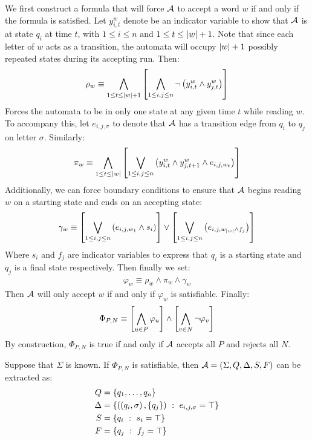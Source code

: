 We first construct a formula that will force \(\mathcal{A}\) to accept
a word \(w\) if and only if the formula is satisfied.
Let \(y_{i, t}^w\) denote be an indicator variable
to show that \(\mathcal{A}\) is at state \(q_i\) at time \(t\),
with \(1 \leq i \leq n\) and \(1 \leq t \leq \left\lvert w\right\rvert + 1\).
Note that since each letter of \(w\) acts as a transition,
the automata will occupy \(\left\lvert w\right\rvert + 1\) possibly repeated
states during its accepting run.
Then:
\begin{align*}
  \rho_w \equiv
    \bigwedge_{1 \leq t \leq \left\lvert w\right\rvert + 1}
      \left[\bigwedge_{1 \leq i, j \leq n}
        \neg \left(y_{i, t} ^w \land y_{j, t} ^w\right)\right]
\end{align*}
Forces the automata to be in only one state at any given time \(t\)
while reading \(w\).
To accompany this, let \(e_{i, j, \sigma}\) to denote
that \(\mathcal{A}\) has a transition edge from \(q_i\) to \(q_j\)
on letter \(\sigma\).
Similarly:
\begin{align*}
  \pi_w \equiv
    \bigwedge_{1 \leq t \leq \left\lvert w\right\rvert}
      \left[\bigvee_{1 \leq i, j \leq n}
      \left(y_{i, t} ^w \land y_{j, t + 1} ^w \land e_{i, j, w_t}\right)\right]
\end{align*}
Additionally, we can force boundary conditions to ensure that \(\mathcal{A}\)
begins reading \(w\) on a starting state and ends on an accepting state:
\begin{align*}
  \gamma_{w} \equiv
    \left[\bigvee_{1 \leq i, j \leq n}
        \left(e_{i, j, w_{1}} \land s_i\right)\right]
      \lor
    \left[\bigvee_{1 \leq i, j \leq n}
        \left(e_{i, j, w_{\left\lvert w\right\rvert} \land f_j}\right)\right]
\end{align*}
Where \(s_i\) and \(f_j\) are indicator variables to express that
\(q_i\) is a starting state and \(q_j\) is a final state respectively.
Then finally we set:
\begin{align*}
  \varphi_{w} \equiv \rho_w \land \pi_w \land \gamma_w
\end{align*}
Then \(\mathcal{A}\) will only accept \(w\) if and only if \(\varphi_w\)
is satisfiable.
Finally:
\begin{align*}
  \Phi_{P, N} \equiv
    \left[\bigwedge_{u \in P} \varphi_u\right]
      \land
    \left[\bigwedge_{v \in N} \neg \varphi_v\right]
\end{align*}
By construction, \(\Phi_{P, N}\) is true if and only if \(\mathcal{A}\)
accepts all \(P\) and rejects all \(N\).

Suppose that \(\Sigma\) is known.
If \(\Phi_{P, N}\) is satisfiable,
then \(\mathcal{A} = \left(\Sigma, Q, \Delta, S, F\right)\) can be extracted as:
\begin{align*}
  Q &= \left\{q_1, \ldots, q_n\right\} \\
  \Delta &= \left\{\left(\left(q_i, \sigma\right), \left\{q_j\right\}\right)
                \  : \  e_{i, j, \sigma} = \top\right\} \\
  S &= \left\{q_i \  : \  s_i = \top\right\} \\
  F &= \left\{q_j \  : \  f_j = \top\right\} \\
\end{align*}



